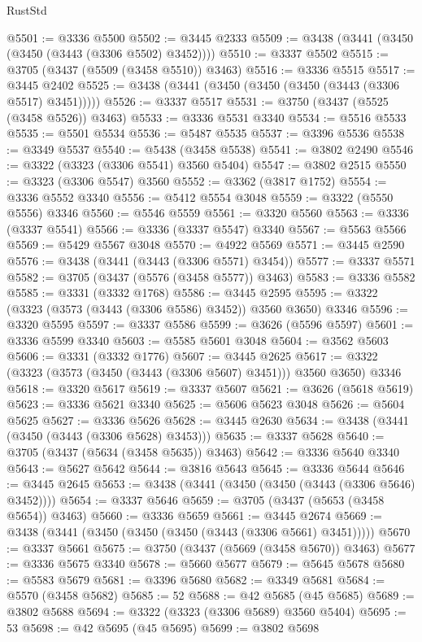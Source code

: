 \begin{lexlean}{RustStd}
\begin{coremodule}
@5501 := @3336 @5500
@5502 := @3445 @2333
@5509 := @3438 (@3441 (@3450 (@3450 (@3443 (@3306 @5502) @3452))))
@5510 := @3337 @5502
@5515 := @3705 (@3437 (@5509 (@3458 @5510)) @3463)
@5516 := @3336 @5515
@5517 := @3445 @2402
@5525 := @3438 (@3441 (@3450 (@3450 (@3450 (@3443 (@3306 @5517) @3451)))))
@5526 := @3337 @5517
@5531 := @3750 (@3437 (@5525 (@3458 @5526)) @3463)
@5533 := @3336 @5531 @3340
@5534 := @5516 @5533
@5535 := @5501 @5534
@5536 := @5487 @5535
@5537 := @3396 @5536
@5538 := @3349 @5537
@5540 := @5438 (@3458 @5538)
@5541 := @3802 @2490
@5546 := @3322 (@3323 (@3306 @5541) @3560 @5404)
@5547 := @3802 @2515
@5550 := @3323 (@3306 @5547) @3560
@5552 := @3362 (@3817 @1752)
@5554 := @3336 @5552 @3340
@5556 := @5412 @5554 @3048
@5559 := @3322 (@5550 @5556) @3346
@5560 := @5546 @5559
@5561 := @3320 @5560
@5563 := @3336 (@3337 @5541)
@5566 := @3336 (@3337 @5547) @3340
@5567 := @5563 @5566
@5569 := @5429 @5567 @3048
@5570 := @4922 @5569
@5571 := @3445 @2590
@5576 := @3438 (@3441 (@3443 (@3306 @5571) @3454))
@5577 := @3337 @5571
@5582 := @3705 (@3437 (@5576 (@3458 @5577)) @3463)
@5583 := @3336 @5582
@5585 := @3331 (@3332 @1768)
@5586 := @3445 @2595
@5595 := @3322 (@3323 (@3573 (@3443 (@3306 @5586) @3452)) @3560 @3650) @3346
@5596 := @3320 @5595
@5597 := @3337 @5586
@5599 := @3626 (@5596 @5597)
@5601 := @3336 @5599 @3340
@5603 := @5585 @5601 @3048
@5604 := @3562 @5603
@5606 := @3331 (@3332 @1776)
@5607 := @3445 @2625
@5617 := @3322 (@3323 (@3573 (@3450 (@3443 (@3306 @5607) @3451))) @3560 @3650) @3346
@5618 := @3320 @5617
@5619 := @3337 @5607
@5621 := @3626 (@5618 @5619)
@5623 := @3336 @5621 @3340
@5625 := @5606 @5623 @3048
@5626 := @5604 @5625
@5627 := @3336 @5626
@5628 := @3445 @2630
@5634 := @3438 (@3441 (@3450 (@3443 (@3306 @5628) @3453)))
@5635 := @3337 @5628
@5640 := @3705 (@3437 (@5634 (@3458 @5635)) @3463)
@5642 := @3336 @5640 @3340
@5643 := @5627 @5642
@5644 := @3816 @5643
@5645 := @3336 @5644
@5646 := @3445 @2645
@5653 := @3438 (@3441 (@3450 (@3450 (@3443 (@3306 @5646) @3452))))
@5654 := @3337 @5646
@5659 := @3705 (@3437 (@5653 (@3458 @5654)) @3463)
@5660 := @3336 @5659
@5661 := @3445 @2674
@5669 := @3438 (@3441 (@3450 (@3450 (@3450 (@3443 (@3306 @5661) @3451)))))
@5670 := @3337 @5661
@5675 := @3750 (@3437 (@5669 (@3458 @5670)) @3463)
@5677 := @3336 @5675 @3340
@5678 := @5660 @5677
@5679 := @5645 @5678
@5680 := @5583 @5679
@5681 := @3396 @5680
@5682 := @3349 @5681
@5684 := @5570 (@3458 @5682)
@5685 := 52
@5688 := @42 @5685 (@45 @5685)
@5689 := @3802 @5688
@5694 := @3322 (@3323 (@3306 @5689) @3560 @5404)
@5695 := 53
@5698 := @42 @5695 (@45 @5695)
@5699 := @3802 @5698

\end{coremodule}
\end{lexlean}
